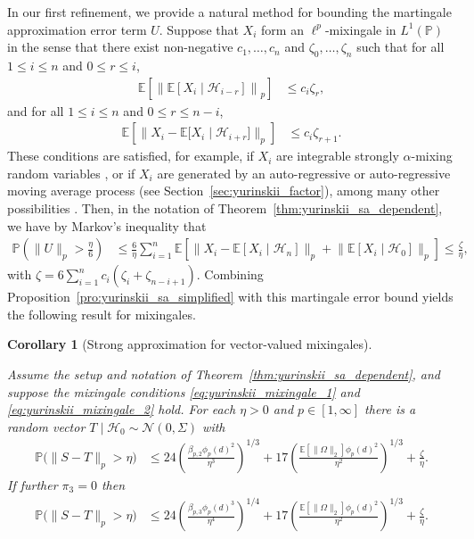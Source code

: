 \documentclass[11pt,lof]{puthesis}
\renewcommand{\P}{\ensuremath{\mathbb{P}}}
\newcommand{\E}{\ensuremath{\mathbb{E}}}
\newcommand{\cH}{\ensuremath{\mathcal{H}}}
\newcommand{\cN}{\ensuremath{\mathcal{N}}}
\theoremstyle{break}
\newtheorem{corollary}{Corollary}[section]
\theoremstyle{proof}
\begin{document}
In our first refinement, we provide a natural method for bounding the
martingale approximation error term $U$. Suppose that $X_i$ form an
$\ell^p$-mixingale in $L^1(\P)$ in the sense that there exist non-negative
$c_1, \ldots, c_n$ and $\zeta_0, \ldots, \zeta_n$ such that for all
$1 \leq i \leq n$ and $0 \leq r \leq i$,
%
\begin{align}
  \label{eq:yurinskii_mixingale_1}
  \E \left[ \left\|
    \E \left[ X_i \mid \cH_{i-r} \right]
  \right\|_p \right]
  &\leq
  c_i \zeta_r,
\end{align}
%
and for all $1 \leq i \leq n$ and $0 \leq r \leq n-i$,
%
\begin{align}
  \label{eq:yurinskii_mixingale_2}
  \E \left[ \big\|
    X_i - \E \big[ X_i \mid \cH_{i+r} \big]
  \big\|_p \right]
  &\leq
  c_i \zeta_{r+1}.
\end{align}
%
These conditions are satisfied, for example, if $X_i$ are integrable strongly
$\alpha$-mixing random variables \citep{mcleish1975invariance}, or if $X_i$ are
generated by an auto-regressive or auto-regressive moving average process (see
Section~\ref{sec:yurinskii_factor}), among many other possibilities
\citep{bradley2005basic}. Then, in the notation of
Theorem~\ref{thm:yurinskii_sa_dependent}, we have by Markov's inequality that
%
\begin{align*}
  \P \left( \|U\|_p > \frac{\eta}{6} \right)
  &\leq
  \frac{6}{\eta}
  \sum_{i=1}^{n}
  \E \left[
    \big\|
    X_i - \E \left[ X_i \mid \cH_n \right]
    \big\|_p
    + \big\|
    \E \left[ X_i \mid \cH_0 \right]
    \big\|_p
  \right]
  \leq \frac{\zeta}{\eta},
\end{align*}
%
with $\zeta = 6 \sum_{i=1}^{n} c_i (\zeta_{i} + \zeta_{n-i+1})$.
Combining Proposition~\ref{pro:yurinskii_sa_simplified} with this
martingale error bound yields the following result for mixingales.
%
\begin{corollary}[Strong approximation for vector-valued mixingales]%
  \label{cor:yurinskii_sa_mixingale}

  Assume the setup and notation of Theorem~\ref{thm:yurinskii_sa_dependent},
  and suppose
  the mixingale conditions \eqref{eq:yurinskii_mixingale_1} and
  \eqref{eq:yurinskii_mixingale_2} hold. For each $\eta > 0$ and
  $p \in [1,\infty]$ there
  is a random vector $T \mid \cH_0 \sim \cN(0, \Sigma)$ with
  \begin{align*}
    \P\big(\|S-T\|_p > \eta\big)
    &\leq
    24 \left(
      \frac{\beta_{p,2} \phi_p(d)^2}{\eta^3}
    \right)^{1/3}
    + 17 \left(
      \frac{\E \left[ \|\Omega\|_2 \right] \phi_p(d)^2}{\eta^2}
    \right)^{1/3}
    + \frac{\zeta}{\eta}.
  \end{align*}
  If further $\pi_3 = 0$ then
  \begin{align*}
    \P\big(\|S-T\|_p > \eta\big)
    &\leq
    24 \left(
      \frac{\beta_{p,3} \phi_p(d)^3}{\eta^4}
    \right)^{1/4}
    + 17 \left(
      \frac{\E \left[ \|\Omega\|_2 \right] \phi_p(d)^2}{\eta^2}
    \right)^{1/3}
    + \frac{\zeta}{\eta}.
  \end{align*}
\end{corollary}
\end{document}
